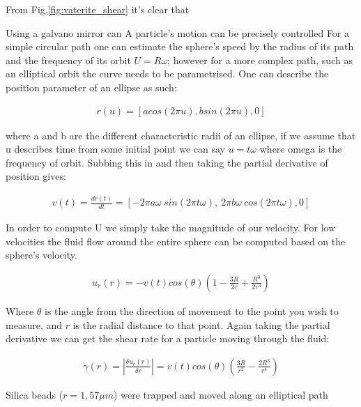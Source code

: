 From Fig.\ref{fig:vaterite_shear} it's clear that 

Using a galvano mirror can A particle's motion can be precisely controlled For a simple circular path one can estimate the sphere's speed by the radius of its path and the frequency of its orbit $U = R\omega$; however for a more complex path, such as an elliptical orbit the curve needs to be parametrised. One can describe the position parameter of an ellipse as such:

\begin{align}
	r(u) = \left[acos(2\pi u),bsin(2\pi u), 0 \right]
\end{align}

where a and b are the different characteristic radii of an ellipse, if we assume that u describes time from some initial point we can say $u=t\omega$ where omega is the frequency of orbit. Subbing this in and then taking the partial derivative of position gives:

\begin{align}
	v(t) = \frac{dr(t)}{dt} = \left[-2\pi a\omega \ sin(2\pi t\omega),\ 2\pi b\omega \ cos(2\pi t\omega),0 \right]
\end{align}

In order to compute U we simply take the magnitude of our velocity. For low velocities the fluid flow around the entire sphere can be computed based on the sphere's velocity.

\begin{align}
	u_r(r)=-v(t)cos(\theta)\left(1-\frac{3R}{2r}+\frac{R^3}{2r^3}\right)
\end{align}

Where $\theta$ is the angle from the direction of movement to the point you wish to measure, and $r$ is the radial distance to that point. Again taking the partial derivative we can get the shear rate for a particle moving through the fluid:

\begin{align}
	\dot{\gamma}(r) = \left| \frac{\delta u_r(r)}{\delta r}\right| = v(t)cos(\theta)\left(\frac{3R}{r^2} -\frac{2R^3}{r^4} \right)
\end{align}

Silica beads ($r=1,57 \mu m$) were trapped and moved along an elliptical path
